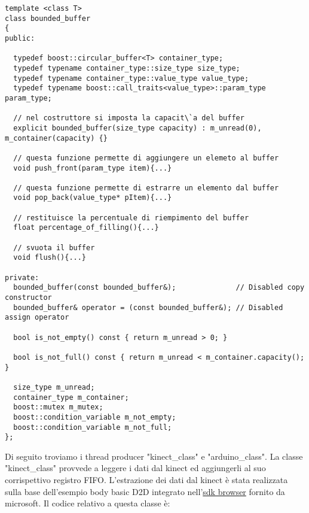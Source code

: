 \documentclass[10pt,a4paper]{article}
\begin{document}
\begin{lstlisting}[style=mycpp, caption=librerie usate, captionpos=b]
template <class T>
class bounded_buffer
{
public:

  typedef boost::circular_buffer<T> container_type;
  typedef typename container_type::size_type size_type;
  typedef typename container_type::value_type value_type;
  typedef typename boost::call_traits<value_type>::param_type param_type;

  // nel costruttore si imposta la capacit\`a del buffer
  explicit bounded_buffer(size_type capacity) : m_unread(0), m_container(capacity) {}

  // questa funzione permette di aggiungere un elemeto al buffer
  void push_front(param_type item){...}

  // questa funzione permette di estrarre un elemento dal buffer 
  void pop_back(value_type* pItem){...}

  // restituisce la percentuale di riempimento del buffer
  float percentage_of_filling(){...}

  // svuota il buffer
  void flush(){...}

private:
  bounded_buffer(const bounded_buffer&);              // Disabled copy constructor
  bounded_buffer& operator = (const bounded_buffer&); // Disabled assign operator

  bool is_not_empty() const { return m_unread > 0; }

  bool is_not_full() const { return m_unread < m_container.capacity(); }

  size_type m_unread;
  container_type m_container;
  boost::mutex m_mutex;
  boost::condition_variable m_not_empty;
  boost::condition_variable m_not_full;
};
\end{lstlisting}
%
%
Di seguito troviamo i thread producer "kinect\_class" e "arduino\_class".
La classe "kinect\_class" provvede a leggere i dati dal kinect ed aggiungerli al suo corrispettivo registro FIFO. L'estrazione dei dati dal kinect \`e stata realizzata sulla base dell'esempio body basic D2D integrato nell'\href{https://www.microsoft.com/en-us/download/details.aspx?id=44561}{sdk browser} fornito da microsoft. Il codice relativo a questa classe \`e:
\end{document}
